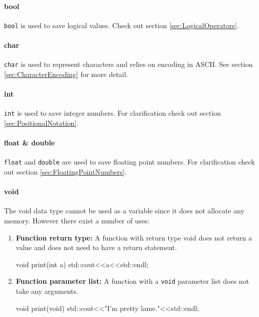 \documentclass[10pt,a4paper]{scrartcl}
\begin{document}
\begin{multicols*}{2}
\paragraph{bool}

\verb+bool+ is used to save logical values. Check out section \ref{sec:LogicalOperators}.

\paragraph{char}

\verb+char+ is used to represent characters and relies on encoding in ASCII. See section \ref{sec:CharacterEncoding} for more detail.

\paragraph{int}

\verb+int+ is used to save integer numbers. For clarification check out section \ref{sec:PositionalNotation}.

\paragraph{float \& double}

\verb+float+ and \verb+double+ are used to save floating point numbers. For clarification check out section \ref{sec:FloatingPointNumbers}.

\paragraph{void}

The void data type cannot be used as a variable since it does not allocate any memory. However there exist a number of uses:

\begin{enumerate}
\item \textbf{Function return type:} A function with return type void does not return a value and does not need to have a return statement.

\begin{TPCpp}
void print(int a){
	std::cout<<a<<std::endl;
}
\end{TPCpp}

\item \textbf{Function parameter list:} A function with a \verb+void+ parameter list does not take any arguments.

\begin{TPCpp}
void print(void){
	std::cout<<"I'm pretty lame."<<std::endl;
}
\end{TPCpp}


\end{enumerate}
\end{multicols*}
\end{document}

